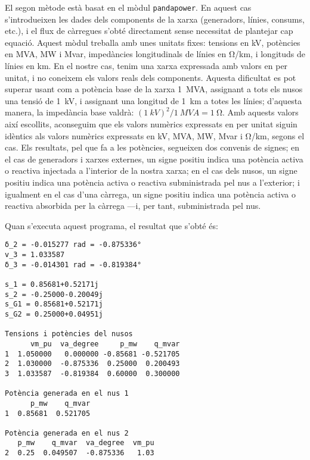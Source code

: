 El segon mètode està basat en el mòdul \texttt{pandapower}. En aquest cas s'introdueixen les dades dels components de la xarxa (generadors, línies, consums, etc.), i el flux de càrregues s'obté directament sense necessitat de plantejar cap equació. Aquest mòdul treballa amb unes unitats fixes: tensions en  \unit{kV}, potències en  \unit{MVA}, \unit{MW} i \unit{Mvar}, impedàncies longitudinals de línies en \unit{\ohm/km}, i longituds de línies en  \unit{km}. En el nostre cas, tenim una xarxa expressada amb valors en per unitat, i no coneixem els valors reals dels components. Aquesta dificultat es pot superar usant com a potència base de la xarxa \qty{1}{MVA}, assignant a tots els nusos una tensió de \qty{1}{kV}, i assignant una longitud de \qty{1}{km} a totes les línies; d'aquesta manera, la impedància base valdrà: $(\qty{1}{kV})^2/\qty{1}{MVA} = \qty{1}{\ohm}$. Amb aquests valors així escollits, aconseguim que els valors numèrics expressats en per unitat siguin idèntics als valors numèrics expressats en 
\unit{kV},  \unit{MVA}, \unit{MW}, \unit{Mvar} i \unit{\ohm/km}, segons el cas. Els resultats, pel que fa a les potències,  segueixen dos convenis de signes; en el cas de generadors i xarxes externes, un signe positiu indica una potència activa o reactiva injectada a l'interior de la nostra xarxa; en el cas dels nusos, un signe positiu indica una potència activa o reactiva subministrada pel nus a l'exterior; i igualment en el cas d'una càrrega, un signe positiu indica una potència activa o reactiva absorbida per la càrrega ---i, per tant, subministrada  pel nus.


Quan s'executa aquest programa, el resultat que s'obté és:
\lstset{
	language=,
	numbers=none,
	frame=none
}
\begin{lstlisting}
δ_2 = -0.015277 rad = -0.875336°
v_3 = 1.033587
δ_3 = -0.014301 rad = -0.819384°

s_1 = 0.85681+0.52171j
s_2 = -0.25000-0.20049j
s_G1 = 0.85681+0.52171j
s_G2 = 0.25000+0.04951j

Tensions i potències del nusos
      vm_pu  va_degree     p_mw    q_mvar
1  1.050000   0.000000 -0.85681 -0.521705
2  1.030000  -0.875336  0.25000  0.200493
3  1.033587  -0.819384  0.60000  0.300000

Potència generada en el nus 1
      p_mw    q_mvar
1  0.85681  0.521705

Potència generada en el nus 2
   p_mw    q_mvar  va_degree  vm_pu
2  0.25  0.049507  -0.875336   1.03
\end{lstlisting} 


